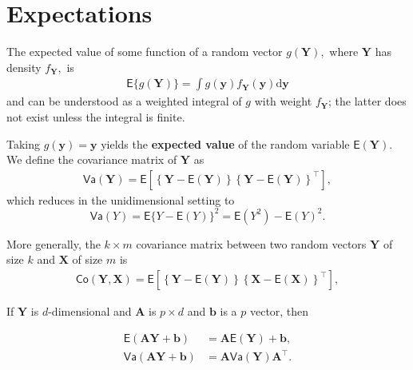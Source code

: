 \documentclass[
  11pt,
  letterpaper,
]{scrbook}
\theoremstyle{definition}
\theoremstyle{plain}
\theoremstyle{plain}
\theoremstyle{plain}
\theoremstyle{definition}
\theoremstyle{definition}
\theoremstyle{plain}
\theoremstyle{plain}
\theoremstyle{remark}
\begin{document}
\section{Expectations}\label{expectations}

The expected value of some function of a random vector
\(g(\boldsymbol{Y}),\) where \(\boldsymbol{Y}\) has density
\(f_{\boldsymbol{Y}},\) is \begin{align*}
\mathsf{E}\{g(\boldsymbol{Y})\} = \int g(\boldsymbol{y}) f_{\boldsymbol{Y}}(\boldsymbol{y}) \mathrm{d} \boldsymbol{y}
\end{align*} and can be understood as a weighted integral of \(g\) with
weight \(f_{\boldsymbol{Y}}\); the latter does not exist unless the
integral is finite.

Taking \(g(\boldsymbol{y}) = \boldsymbol{y}\) yields the
\textbf{expected value} of the random variable
\(\mathsf{E}(\boldsymbol{Y}).\) We define the covariance matrix of
\(\boldsymbol{Y}\) as \begin{align*}
\mathsf{Va}(\boldsymbol{Y}) = \mathsf{E}\left[\left\{\boldsymbol{Y} - \mathsf{E}(\boldsymbol{Y})\right\}\left\{\boldsymbol{Y} - \mathsf{E}(\boldsymbol{Y})\right\}^\top\right],
\end{align*} which reduces in the unidimensional setting to
\[\mathsf{Va}(Y) = \mathsf{E}\{Y - \mathsf{E}(Y)\}^2 = \mathsf{E}(Y^2) - \mathsf{E}(Y)^2.\]

More generally, the \(k \times m\) covariance matrix between two random
vectors \(\boldsymbol{Y}\) of size \(k\) and \(\boldsymbol{X}\) of size
\(m\) is \begin{align*}
\mathsf{Co}(\boldsymbol{Y}, \boldsymbol{X}) = \mathsf{E}\left[\left\{\boldsymbol{Y} - \mathsf{E}(\boldsymbol{Y})\right\}\left\{\boldsymbol{X} - \mathsf{E}(\boldsymbol{X})\right\}^\top\right],
\end{align*}

If \(\boldsymbol{Y}\) is \(d\)-dimensional and \(\mathbf{A}\) is
\(p \times d\) and \(\boldsymbol{b}\) is a \(p\) vector, then

\begin{align*}
\mathsf{E}(\boldsymbol{AY} + \boldsymbol{b}) &= \boldsymbol{A}\mathsf{E}(\boldsymbol{Y}) + \boldsymbol{b},\\
\mathsf{Va}(\boldsymbol{AY} + \boldsymbol{b}) &= \boldsymbol{A}\mathsf{Va}(\boldsymbol{Y})\boldsymbol{A}^\top.
\end{align*}
\end{document}
